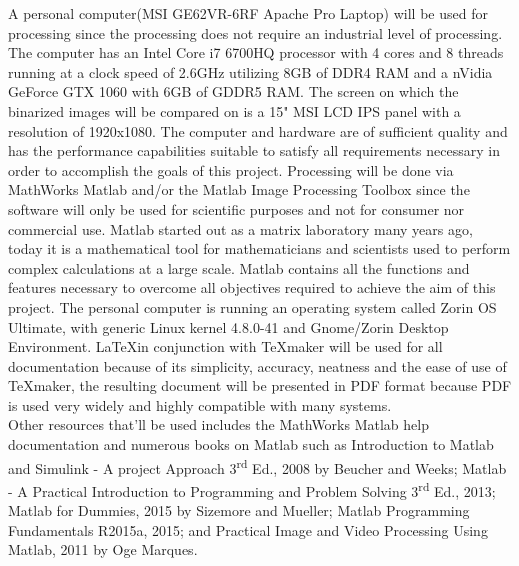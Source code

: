 \documentclass[11pt]{article}
\begin{document}
	A personal computer(MSI GE62VR-6RF Apache Pro Laptop) will be used for processing since the processing does not require an industrial level of processing. The computer has an Intel Core i7 6700HQ processor with 4 cores and 8 threads running at a clock speed of 2.6\gls{GHz} utilizing 8GB of DDR4 RAM and a nVidia GeForce GTX 1060 with 6GB of GDDR5 RAM. The screen on which the binarized images will be compared on is a 15" MSI LCD IPS panel with a resolution of 1920x1080. The computer and hardware are of sufficient quality and has the performance capabilities suitable to satisfy all requirements necessary in order to accomplish the goals of this project. Processing will be done via MathWorks Matlab and/or the Matlab Image Processing Toolbox since the software will only be used for scientific purposes and not for consumer nor commercial use. Matlab started out as a matrix laboratory many years ago, today it is a mathematical tool for mathematicians and scientists used to perform complex calculations at a large scale. Matlab contains all the functions and features necessary to overcome all objectives required to achieve the aim of this project. The personal computer is running an operating system called Zorin OS Ultimate, with generic Linux kernel 4.8.0-41 and Gnome/Zorin Desktop Environment. \LaTeX \space in conjunction with \TeX maker will be used for all documentation because of its simplicity, accuracy, neatness and the ease of use of \TeX maker, the resulting document will be presented in PDF format because PDF is used very widely and highly compatible with many systems.\\

	Other resources that'll be used includes the MathWorks Matlab help documentation and numerous books on Matlab such as Introduction to Matlab and Simulink - A project Approach 3\textsuperscript{rd} Ed., 2008 by Beucher and Weeks; Matlab - A Practical Introduction to Programming and Problem Solving 3\textsuperscript{rd} Ed., 2013; Matlab for Dummies, 2015 by Sizemore and Mueller; Matlab Programming Fundamentals R2015a, 2015; and Practical Image and Video Processing Using Matlab, 2011 by Oge Marques.
\end{document}

